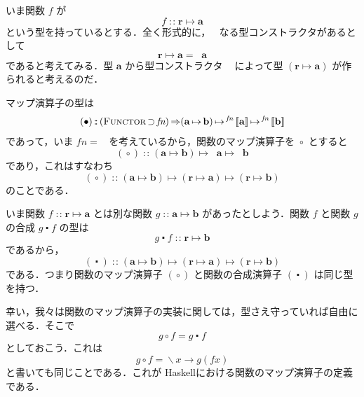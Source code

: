 \documentclass[a4paper,twocolumn]{jsbook}
\def\[{\left[\!\left[}
\def\]{\right]\!\right]}
\newcommand{\programminglanguage}[1]{\textsf{#1}}
\newcommand{\haskell}{\programminglanguage{Haskell}}
\DeclareMathOperator{\mSuperClass}{\Rightarrow}
\DeclareMathOperator{\mSuperSet}{\supset}
\DeclareMathOperator{\mComp}{\centerdot}
\DeclareMathOperator{\mIn}{{:\!:}}
\DeclareMathOperator{\mLambda}{\backslash}
\DeclareMathOperator{\mLambdaArrow}{\rightarrow}
\DeclareMathOperator{\mMap}{\bullet}
\DeclareMathOperator{\mMapFunc}{\circ}
\DeclareMathOperator{\mMapsTo}{\mapsto}
\newcommand{\mType}[1]{\mathbf{#1}}
\newcommand{\mTypeConstructor}[1]{\textit{#1}}
\newcommand{\mFuncTypeConstructor}[1]{\mathop{\mTypeConstructor{Func}_\mType{#1}}}
\newcommand{\mGenericTypeAssemble}[2]{{}^{\mTypeConstructor{#1}}\[\mType{#2}\]}
\newcommand{\mGenericTypeClass}[1]{\textsc{#1}} %
\newcommand{\mFunctorTypeClass}{\mGenericTypeClass{Functor}}
\newcommand{\mLambdaExp}[2]{\mLambda{#1}\mLambdaArrow{#2}}
\newcommand{\mProj}[2]{#1\mMapsTo#2}
\begin{document}
いま関数 $f$ が
\begin{equation}
f\mIn\mProj{\mType{r}}{\mType{a}}
\end{equation}
という型を持っているとする．全く形式的に，$\mFuncTypeConstructor{r}$ なる型コンストラクタがあるとして
\begin{equation}
\mProj{\mType{r}}{\mType{a}}=\mFuncTypeConstructor{r}\mType{a}
\end{equation}
であると考えてみる．型 $\mType{a}$ から型コンストラクタ $\mFuncTypeConstructor{r}$ によって型 $(\mProj{\mType{r}}{\mType{a}})$ が作られると考えるのだ．

マップ演算子の型は
\begin{equation}
(\mMap)\mIn{}(\mFunctorTypeClass\mSuperSet\mTypeConstructor{fn})\mSuperClass\mProj{\mProj{(\mProj{\mType{a}}{\mType{b}})}{\mGenericTypeAssemble{fn}{a}}}{\mGenericTypeAssemble{fn}{b}}
\end{equation}
であって，いま $\mTypeConstructor{fn}=\mFuncTypeConstructor{r}$ を考えているから，関数のマップ演算子を $\mMapFunc$ とすると
\begin{equation}
(\mMapFunc)\mIn{}\mProj{\mProj{(\mProj{\mType{a}}{\mType{b}})}{\mFuncTypeConstructor{r}\mType{a}}}{\mFuncTypeConstructor{r}\mType{b}}
\end{equation}
であり，これはすなわち
\begin{equation}
(\mMapFunc)
\mIn{}\mProj{
  \mProj{
    (\mProj{\mType{a}}{\mType{b}})
  }
  {
    (\mProj{\mType{r}}{\mType{a}})
  }
}
{
  (\mProj{\mType{r}}{\mType{b}})
}
\end{equation}
のことである．

いま関数 $f\mIn\mProj{\mType{r}}{\mType{a}}$ とは別な関数 $g\mIn\mProj{\mType{a}}{\mType{b}}$ があったとしよう．関数 $f$ と関数 $g$ の合成 $g\mComp f$ の型は
\begin{equation}
g\mComp f\mIn\mProj{\mType{r}}{\mType{b}}
\end{equation}
であるから，
\begin{equation}
(\mComp)
\mIn{}\mProj{
  \mProj{
    (\mProj{\mType{a}}{\mType{b}})
  }
  {
    (\mProj{\mType{r}}{\mType{a}})
  }
}
{
  (\mProj{\mType{r}}{\mType{b}})
}
\end{equation}
である．つまり関数のマップ演算子 $(\mMapFunc)$ と関数の合成演算子 $(\mComp)$ は同じ型を持つ．

幸い，我々は関数のマップ演算子の実装に関しては，型さえ守っていれば自由に選べる．そこで
\begin{equation}
g\mMapFunc f=g\mComp f
\end{equation}
としておこう．これは
\begin{equation}
g\mMapFunc f=\mLambdaExp{x}{g(fx)}
\end{equation}
と書いても同じことである．これが \haskell における関数のマップ演算子の定義である．
\end{document}

